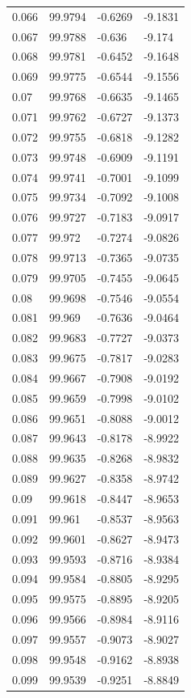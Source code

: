 \begin{tabular}{llll}
0.066 & 99.9794 & -0.6269 & -9.1831 \\
0.067 & 99.9788 & -0.636 & -9.174 \\
0.068 & 99.9781 & -0.6452 & -9.1648 \\
0.069 & 99.9775 & -0.6544 & -9.1556 \\
0.07 & 99.9768 & -0.6635 & -9.1465 \\
0.071 & 99.9762 & -0.6727 & -9.1373 \\
0.072 & 99.9755 & -0.6818 & -9.1282 \\
0.073 & 99.9748 & -0.6909 & -9.1191 \\
0.074 & 99.9741 & -0.7001 & -9.1099 \\
0.075 & 99.9734 & -0.7092 & -9.1008 \\
0.076 & 99.9727 & -0.7183 & -9.0917 \\
0.077 & 99.972 & -0.7274 & -9.0826 \\
0.078 & 99.9713 & -0.7365 & -9.0735 \\
0.079 & 99.9705 & -0.7455 & -9.0645 \\
0.08 & 99.9698 & -0.7546 & -9.0554 \\
0.081 & 99.969 & -0.7636 & -9.0464 \\
0.082 & 99.9683 & -0.7727 & -9.0373 \\
0.083 & 99.9675 & -0.7817 & -9.0283 \\
0.084 & 99.9667 & -0.7908 & -9.0192 \\
0.085 & 99.9659 & -0.7998 & -9.0102 \\
0.086 & 99.9651 & -0.8088 & -9.0012 \\
0.087 & 99.9643 & -0.8178 & -8.9922 \\
0.088 & 99.9635 & -0.8268 & -8.9832 \\
0.089 & 99.9627 & -0.8358 & -8.9742 \\
0.09 & 99.9618 & -0.8447 & -8.9653 \\
0.091 & 99.961 & -0.8537 & -8.9563 \\
0.092 & 99.9601 & -0.8627 & -8.9473 \\
0.093 & 99.9593 & -0.8716 & -8.9384 \\
0.094 & 99.9584 & -0.8805 & -8.9295 \\
0.095 & 99.9575 & -0.8895 & -8.9205 \\
0.096 & 99.9566 & -0.8984 & -8.9116 \\
0.097 & 99.9557 & -0.9073 & -8.9027 \\
0.098 & 99.9548 & -0.9162 & -8.8938 \\
0.099 & 99.9539 & -0.9251 & -8.8849 \\

\end{tabular}
